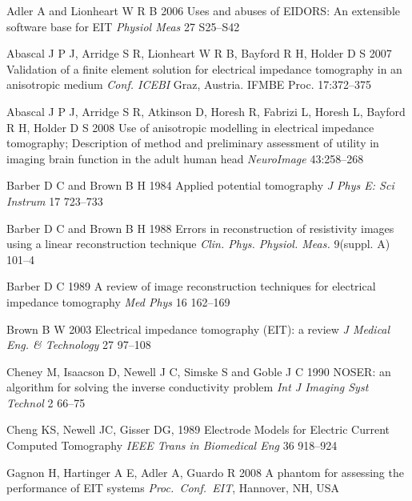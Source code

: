 \documentclass[12pt,draft]{iopart}
\begin{document}
\item[]
Adler A and Lionheart W R B 2006
Uses and abuses of EIDORS: An extensible software base for EIT
{\em Physiol Meas}
27 S25--S42

\item[]
Abascal J P J, Arridge S R, Lionheart W R B, Bayford R H, Holder D S  2007
Validation of a finite element solution for electrical impedance tomography in an anisotropic medium
{\em Conf. ICEBI} Graz, Austria.
IFMBE Proc. 17:372--375

\item[]
Abascal J P J, Arridge S R, Atkinson D, Horesh R, Fabrizi L, Horesh L, Bayford R H, Holder D S  2008
Use of anisotropic modelling in electrical impedance tomography; Description of method and preliminary assessment of utility in imaging brain function in the adult human head
{\em NeuroImage} 43:258--268


%

\item[]
Barber D C and Brown B H 1984
Applied potential tomography
{\em J Phys E: Sci Instrum}
 17 723--733

\item[]
Barber D C and Brown B H 1988 Errors in reconstruction of
resistivity images using a linear reconstruction technique {\em
Clin. Phys. Physiol. Meas.} 
9(suppl. A) 101--4

\item[]
Barber D C 1989
A review of image reconstruction techniques for electrical
 impedance tomography
{\em Med Phys}
16 162--169


\item[]
Brown B W 2003
Electrical impedance tomography (EIT): a review
{\em J Medical Eng. \& Technology}
27 97--108


\item[]
Cheney M, Isaacson D, Newell J C, Simske S and Goble J C 1990
NOSER: an algorithm for solving the inverse conductivity problem
{\em Int J Imaging Syst Technol} 
2 66--75

\item[]
Cheng KS, Newell JC, Gisser DG, 1989
Electrode Models for Electric Current Computed Tomography
{\em IEEE Trans in Biomedical Eng}
36 918--924

\item[]
Gagnon H, Hartinger A E, Adler A, Guardo R 2008
A phantom for assessing the performance of EIT systems
{\em Proc.\ Conf.\ EIT}, Hannover, NH, USA
\end{document}
